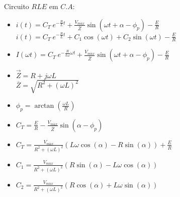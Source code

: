 \quad Circuito  $RLE$ em $C.A$:\par
\begin{itemize}
\item
$i(t)=C_T\ e^{-\frac{R}{L}t}+\frac{V_{m\acute{a}x}}{\overline{Z}}\sin(\omega t + \alpha - \phi_p)-\frac{E}{R}$\newline
$i(t)=C_T\ e^{-\frac{R}{L}t} + C_1 \cos (\omega t) + C_2 \sin(\omega t)-\frac{E}{R}$
\item
$I(\omega t)=C_T\ e^{-\frac{R}{L \omega}\omega t}+\frac{V_{m\acute{a}x}}{\overline{Z}}\sin(\omega t + \alpha - \phi_p)-\frac{E}{R}$
\item
$\overrightarrow{Z}=R+j\omega L$\\
$\overline{Z}=\sqrt{R^2 + (\omega L)^2}$
\item
$\phi_p=\arctan(\frac{\omega L}{R})$
\item
$C_T=\frac{E}{R}-\frac{V_{m\acute{a}x}}{\overline{Z}}\sin(\alpha - \phi_p)$
\item
$C_T=\frac{V_{m\acute{a}x}}{R^2 + (\omega L)^2}(L \omega \cos(\alpha) - R \sin (\alpha))+\frac{E}{R}$
\item
$C_1=\frac{V_{m\acute{a}x}}{R^2 + (\omega L)^2}(R \sin (\alpha) - L \omega \cos(\alpha))$
\item
$C_2=\frac{V_{m\acute{a}x}}{R^2 + (\omega L)^2}(R \cos (\alpha) + L \omega \sin (\alpha))$
%
\end{itemize}
